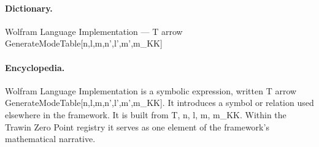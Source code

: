 \paragraph{Dictionary.}
Wolfram Language Implementation — T arrow GenerateModeTable[n,l,m,n',l',m',m\_KK]

\paragraph{Encyclopedia.}
Wolfram Language Implementation is a symbolic expression, written T arrow GenerateModeTable[n,l,m,n',l',m',m\_KK]. It introduces a symbol or relation used elsewhere in the framework. It is built from T, n, l, m, m\_KK. Within the Trawin Zero Point registry it serves as one element of the framework's mathematical narrative.
